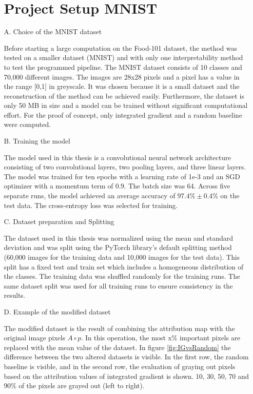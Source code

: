 \section{Project Setup MNIST}
\label{sec:MNIST}

A. Choice of the MNIST dataset

Before starting a large computation on the Food-101 dataset, the method was tested on a smaller dataset (MNIST) and with only one interpretability method to test the programmed pipeline. The MNIST dataset consists of 10 classes and 70,000 different images. The images are 28x28 pixels and a pixel has a value in the range [0,1] in greyscale. It was chosen because it is a small dataset and the reconstruction of the method can be achieved easily. Furthermore, the dataset is only 50 MB in size and a model can be trained without significant computational effort. For the proof of concept, only integrated gradient \cite{sundararajan2017axiomatic} and a random baseline were computed.

B. Training the model

The model used in this thesis is a convolutional neural network architecture consisting of two convolutional layers, two pooling layers, and three linear layers. The model was trained for ten epochs with a learning rate of 1e-3 and an SGD optimizer with a momentum term of 0.9. The batch size was 64. Across five separate runs, the model achieved an average accuracy of $97.4\%\pm0.4\%$ on the test data. The cross-entropy loss was selected for training.

C. Dataset preparation and Splitting

The dataset used in this thesis was normalized using the mean and standard deviation and was split using the PyTorch library's default splitting method (60,000 images for the training data and 10,000 images for the test data). This split has a fixed test and train set which includes a homogeneous distribution of the classes. The training data was shuffled randomly for the training runs. The same dataset split was used for all training runs to ensure consistency in the results.

D. Example of the modified dataset

The modified dataset is the result of combining the attribution map with the original image pixels $A \circ p$. In this operation, the most x\% important pixels are replaced with the mean value of the dataset. In figure \ref{fig:IGvsRandom} the difference between the two altered datasets is visible. In the first row, the random baseline is visible, and in the second row, the evaluation of graying out pixels based on the attribution values of integrated gradient is shown. 10, 30, 50, 70 and 90\% of the pixels are grayed out (left to right).


